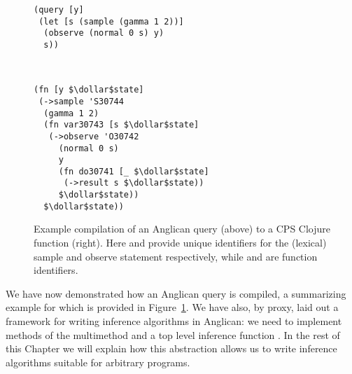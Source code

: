 \begin{figure}[t]
	\centering
	\begin{minipage}[t]{0.49\textwidth}
		\centering	
		\begin{lstlisting}[basicstyle=\ttfamily\footnotesize]
(query [y]
 (let [s (sample (gamma 1 2))]
  (observe (normal 0 s) y)
  s))
		\end{lstlisting}
		\vspace{-7pt}
\caption{Example compilation of an Anglican query (above) to a
	CPS Clojure function (right).
	Here  and  provide unique identifiers
	for the (lexical) sample and observe statement respectively, while
	 and  are function identifiers. 
				\label{fig:proginf:comp}}
	\end{minipage}
	~~
	\begin{minipage}[t]{0.47\textwidth}
		\centering	
		\begin{lstlisting}[basicstyle=\ttfamily\footnotesize]
(fn [y $\dollar$state]
 (->sample 'S30744
  (gamma 1 2) 
  (fn var30743 [s $\dollar$state] 
   (->observe 'O30742
     (normal 0 s) 
     y
     (fn do30741 [_ $\dollar$state] 
      (->result s $\dollar$state)) 
     $\dollar$state)) 
  $\dollar$state))
		\end{lstlisting}	
	\end{minipage}
\end{figure}

We have now demonstrated how an Anglican query is compiled, a summarizing example for which
is provided in Figure~\ref{fig:proginf:comp}.  We have also, by proxy, laid out a framework for
writing inference algorithms in Anglican: we need to implement methods of the \checkpoint multimethod
and a top level inference function \anginfer.  
In the rest of this Chapter we will
explain how this abstraction allows us to write inference algorithms suitable for arbitrary programs.